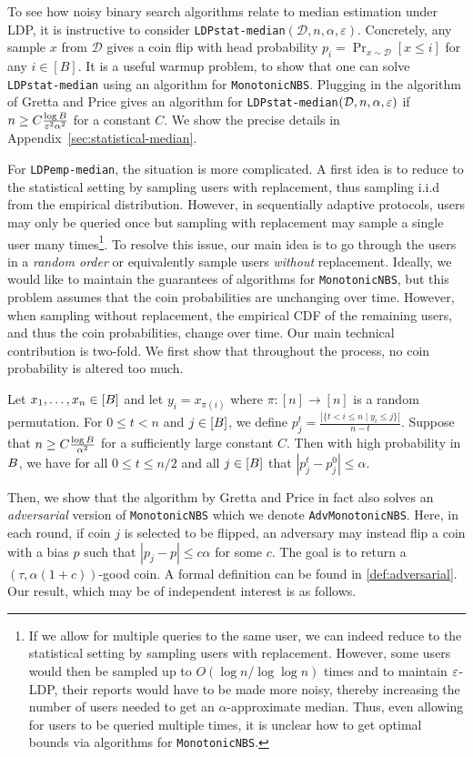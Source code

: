 To see how noisy binary search algorithms relate to median estimation under LDP, it is instructive to consider \texttt{LDPstat-median}$(\mathcal{D}, n, \alpha, \varepsilon)$.
%
%
Concretely, any sample $x$ from $\mathcal{D}$ gives a coin flip with head probability $p_i = \Pr_{x\sim \mathcal{D}}[x\leq i]$ for any $i\in [B]$.
%
%
It is a useful warmup problem, to show that one can solve \texttt{LDPstat-median} using an algorithm for \texttt{MonotonicNBS}. Plugging in the algorithm of Gretta and Price gives an algorithm for \texttt{LDPstat-median}$(\mathcal{D},n,\alpha,\varepsilon)$ if $n \geq C \frac{\log B}{\varepsilon^2\alpha^2}$ for a constant $C$. We show the precise details in Appendix~\ref{sec:statistical-median}.




For \texttt{LDPemp-median}, the situation is more complicated.  
A first idea is to reduce to the statistical setting by sampling users with replacement, thus sampling i.i.d from the empirical distribution. However, in sequentially adaptive protocols, users may only be queried once but sampling with replacement may sample a single user many times\footnote{If we allow for multiple queries to the same user, we can indeed reduce to the statistical setting by sampling users with replacement. However, some users would then be sampled up to $O(\log n/\log\log n)$ times and to maintain $\varepsilon$-LDP, their reports would have to be made more noisy, thereby increasing the number of users needed to get an $\alpha$-approximate median. Thus, even allowing for users to be queried multiple times, it is unclear how to get optimal bounds via algorithms for \texttt{MonotonicNBS}.}. 
To resolve this issue, our main idea is to go through the users in a \emph{random order} or equivalently sample users \emph{without} replacement. Ideally, we would like to maintain the guarantees of algorithms for \texttt{MonotonicNBS}, but this problem assumes that the coin probabilities are unchanging over time. However, when sampling without replacement, the empirical CDF of the remaining users, and thus the coin probabilities, change over time. Our main technical contribution is two-fold. We first show that throughout the process, no coin probability is altered too much.
\begin{lemma}\label{lemma:CDF-bound}
Let $x_1,\dots,x_n\in[B]$ and let $y_i=x_{\pi(i)}$ where $\pi:[n]\to [n]$ is a random permutation. For $0\leq t< n$ and $j\in [B]$, we define $p_j^t=\frac{|\{t< i\leq n\mid y_i\leq j\}|}{n-t}$. Suppose that $n\geq C\frac{\log B}{\alpha^2}$ for a sufficiently large constant $C$. Then with high probability in $B$, we have for all $0\leq t\leq n/2$ and all $j\in[B]$ that $|p^{t}_j-p^{0}_j|\leq \alpha$.
\end{lemma}
Then, we show that %
the algorithm by Gretta and Price in fact also solves an \emph{adversarial} version of \texttt{MonotonicNBS} which we denote \texttt{AdvMonotonicNBS}. Here, in each round, if coin $j$ is selected to be flipped, an adversary may instead flip a coin with a bias $p$ such that $|p_j - p| \leq c\alpha$ for some $c$. The goal is to return a $(\tau,\alpha (1+c))$-good coin. A formal definition can be found in \autoref{def:adversarial}. Our result, which may be of independent interest is as follows.

